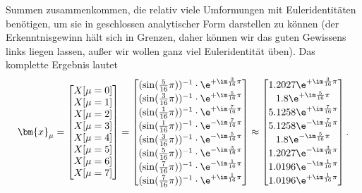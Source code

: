 \begin{ExCalc}
Summen zusammenkommen, die relativ viele Umformungen mit Euleridentitäten
benötigen, um sie in geschlossen analytischer Form darstellen zu können
(der Erkenntnisgewinn hält sich in Grenzen, daher können wir das guten Gewissens
links liegen lassen, außer wir wollen ganz viel Euleridentität üben).
%
Das komplette Ergebnis lautet
\begin{align}
\bm{x}_\mu =
\begin{bmatrix}
X[\mu=0]\\X[\mu=1]\\X[\mu=2]\\X[\mu=3]\\X[\mu=4]\\X[\mu=5]\\X[\mu=6]\\X[\mu=7]
\end{bmatrix}
=
\begin{bmatrix}
(\sin(\frac{5}{16}\pi))^{-1} \cdot \e^{+\im \frac{3}{16}\pi}\\
(\sin(\frac{3}{16}\pi))^{-1} \cdot \e^{+\im \frac{5}{16}\pi}\\
(\sin(\frac{1}{16}\pi))^{-1} \cdot \e^{+\im \frac{7}{16}\pi}\\
(\sin(\frac{1}{16}\pi))^{-1} \cdot \e^{-\im \frac{7}{16}\pi}\\
(\sin(\frac{3}{16}\pi))^{-1} \cdot \e^{-\im \frac{5}{16}\pi}\\
(\sin(\frac{5}{16}\pi))^{-1} \cdot \e^{-\im \frac{3}{16}\pi}\\
(\sin(\frac{7}{16}\pi))^{-1} \cdot \e^{-\im \frac{1}{16}\pi}\\
(\sin(\frac{7}{16}\pi))^{-1} \cdot \e^{+\im \frac{1}{16}\pi}\\
\end{bmatrix}
\approx
\begin{bmatrix}
1.2027\e^{+\im \frac{3}{16}\pi}\\
1.8\e^{+\im \frac{5}{16}\pi}\\
5.1258\e^{+\im \frac{7}{16}\pi}\\
5.1258\e^{-\im \frac{7}{16}\pi}\\
1.8\e^{-\im \frac{5}{16}\pi}\\
1.2027\e^{-\im \frac{3}{16}\pi}\\
1.0196\e^{-\im \frac{1}{16}\pi}\\
1.0196\e^{+\im \frac{1}{16}\pi}\\
\end{bmatrix}.
\end{align}


\end{ExCalc}
